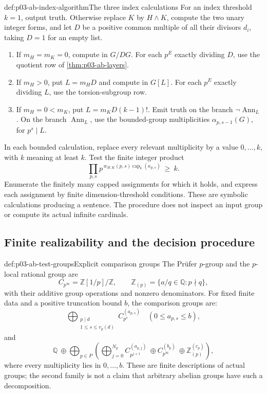 \begin{hbmethod}{def:p03-ab-index-algorithm}{The three index calculations}
For an index threshold \(k=1\), output truth. Otherwise replace \(K\)
by \(H\land K\), compute the two unary integer forms, and let \(D\)
be a positive common multiple of all their divisors \(d_i\), taking
\(D=1\) for an empty list.
\begin{enumerate}
 \item If \(m_H=m_K=0\), compute in \(G/DG\). For each \(p^E\) exactly
       dividing \(D\), use the quotient row of
       \cref{thm:p03-ab-layers}.
 \item If \(m_H>0\), put \(L=m_HD\) and compute in \(G[L]\). For each
       \(p^E\) exactly dividing \(L\), use the torsion-subgroup row.
 \item If \(m_H=0<m_K\), put \(L=m_KD(k-1)!\).
       Emit truth on the branch \(\neg\operatorname{Ann}_L\).
       On the branch \(\operatorname{Ann}_L\), use the bounded-group
       multiplicities \(\alpha_{p,s-1}(G)\), for \(p^s\mid L\).
\end{enumerate}
In each bounded calculation, replace every relevant multiplicity by
a value \(0,\ldots,k\), with \(k\) meaning at least \(k\). Test the finite
integer product
\[
 \prod_{p,s}p^{\,w_{H,K}(p,s)\operatorname{cap}_k(\kappa_{p,s})}
       \ \geq\ k.
\]
Enumerate the finitely many capped assignments for which it holds,
and express each assignment by finite dimension-threshold conditions.
These are symbolic calculations producing a sentence. The procedure
does not inspect an input group or compute its actual infinite cardinals.
\end{hbmethod}

\subsection{Finite realizability and the decision procedure}

\begin{hbdefinition}{def:p03-ab-test-groups}{Explicit comparison groups}
The Prüfer \(p\)-group and the \(p\)-local rational group are
\[
 C_{p^\infty}=\mathbb Z[1/p]/\mathbb Z,\qquad
 \mathbb Z_{(p)}=\{a/q\in\mathbb Q:p\nmid q\},
\]
with their additive group operations and nonzero denominators.
For fixed finite data and a positive truncation bound \(b\), the
comparison groups are:
\[
 \bigoplus_{\substack{p\mid d\\1\leq s\leq v_p(d)}}
                 C_{p^s}^{(a_{p,s})}
 \quad (0\leq a_{p,s}\leq b),
\]
and
\[
 \mathbb Q\ \oplus
 \bigoplus_{p\in P}
 \left(
   \bigoplus_{j=0}^{N_p}C_{p^{j+1}}^{(a_{p,j})}
   \ \oplus C_{p^\infty}^{(b_p)}
   \ \oplus \mathbb Z_{(p)}^{(c_p)}
 \right),
\]
where every multiplicity lies in \(0,\ldots,b\).
These are finite descriptions of actual groups; the second family is
not a claim that arbitrary abelian groups have such a decomposition.
\end{hbdefinition}

